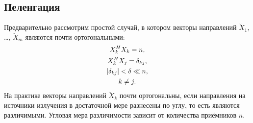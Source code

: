 \subsection{Пеленгация}

Предварительно рассмотрим простой случай, в котором векторы направлений $\breve{X}_1$, \dots, $\breve{X}_m$ являются почти ортогональными:
\begin{gather*}
    X_k^H X_k = n, \\
    X_k^H X_j = \delta_{kj}, \\
    \left | \delta_{kj} \right | < \delta \ll n, \\
    k \neq j .
\end{gather*}
На практике векторы направлений $\breve{X}_k$ почти ортогональны, если направления на источники излучения в достаточной мере разнесены по углу, то есть являются
различимыми. Угловая мера различимости зависит от количества приёмников $n$.

